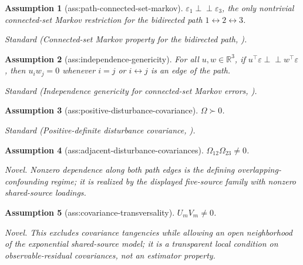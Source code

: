 \documentclass{article}
\newtheorem{assumption}{Assumption}
\begin{document}
\begin{assumption}[ass:path-connected-set-markov]\label{ass:path-connected-set-markov}
\(\varepsilon_1\perp\!\!\!\perp\varepsilon_3\), the only nontrivial connected-set Markov restriction for the bidirected path \(1\!\leftrightarrow\!2\!\leftrightarrow\!3\).
\par\smallskip\noindent\emph{Standard} (Connected-set Markov property for the bidirected path, \cite{TramontanoDrtonEtesami2026}).
\end{assumption}

\begin{assumption}[ass:independence-genericity]\label{ass:independence-genericity}
For all \(u,w\in\mathbb R^3\), if \(u^\top\varepsilon\perp\!\!\!\perp w^\top\varepsilon\), then \(u_iw_j=0\) whenever \(i=j\) or \(i\leftrightarrow j\) is an edge of the path.
\par\smallskip\noindent\emph{Standard} (Independence genericity for connected-set Markov errors, \cite{TramontanoDrtonEtesami2026}).
\end{assumption}

\begin{assumption}[ass:positive-disturbance-covariance]\label{ass:positive-disturbance-covariance}
\(\Omega\succ0\).
\par\smallskip\noindent\emph{Standard} (Positive-definite disturbance covariance, \cite{DrtonFoygelSullivant2011}).
\end{assumption}

\begin{assumption}[ass:adjacent-disturbance-covariances]\label{ass:adjacent-disturbance-covariances}
\(\Omega_{12}\Omega_{23}\neq0\).
\par\smallskip\noindent\emph{Novel.} Nonzero dependence along both path edges is the defining overlapping-confounding regime; it is realized by the displayed five-source family with nonzero shared-source loadings.
\end{assumption}

\begin{assumption}[ass:covariance-transversality]\label{ass:covariance-transversality}
\(U_mV_m\neq0\).
\par\smallskip\noindent\emph{Novel.} This excludes covariance tangencies while allowing an open neighborhood of the exponential shared-source model; it is a transparent local condition on observable-residual covariances, not an estimator property.
\end{assumption}
\end{document}
